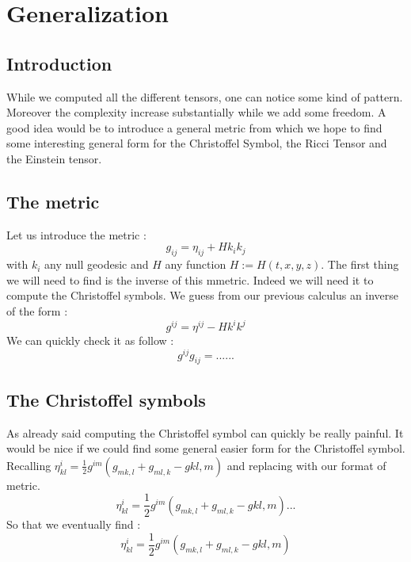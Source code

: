 \documentclass{article}
\begin{document}
\section{Generalization}
    \subsection{Introduction}
        While we computed all the different tensors, one can notice some kind of pattern.
        Moreover the complexity increase substantially while we add some freedom.
        A good idea would be to introduce a general metric from which we hope to find some interesting general form for the Christoffel Symbol, the Ricci Tensor and the Einstein tensor.
    \subsection{The metric}
        Let us introduce the metric :
        \begin{equation}
            g_{ij}=\eta_{ij}+Hk_ik_j
        \end{equation}
        with $k_i$ any null geodesic and $H$ any function $H:=H(t,x,y,z)$.
        The first thing we will need to find is the inverse of this mmetric.
        Indeed we will need it to compute the Christoffel symbols.
        We guess from our previous calculus an inverse of the form :
        \begin{equation}
            g^{ij}=\eta^{ij}-Hk^ik^j
        \end{equation}
        We can quickly check it as follow :
        \begin{equation*}
            g^{ij}g_{ij}= ...
            ...
        \end{equation*}
    \subsection{The Christoffel symbols}
        As already said computing the Christoffel symbol can quickly be really painful.
        It would be nice if we could find some general easier form for the Christoffel symbol.
        Recalling $\eta^i_{kl}=\frac{1}{2}g^{im}(g_{mk,l}+g_{ml,k}-g{kl,m})$ and replacing with our format of metric.
        \begin{equation*}
            \eta^i_{kl}=\frac{1}{2}g^{im}(g_{mk,l}+g_{ml,k}-g{kl,m})
            ...
        \end{equation*}
        So that we eventually find :
        \begin{equation*}
            \eta^i_{kl}=\frac{1}{2}g^{im}(g_{mk,l}+g_{ml,k}-g{kl,m})
        \end{equation*}
\end{document}
